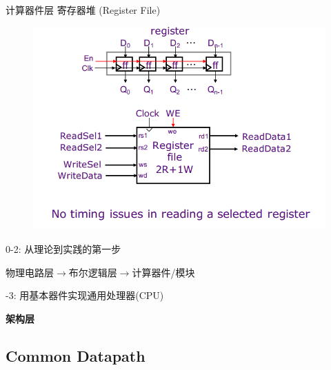 \documentclass[UTF8]{ctexbeamer}
\begin{document}
\begin{frame}{计算器件层}
寄存器堆 (Register File)
\begin{figure}
\centering
\includegraphics[width=0.8\linewidth]{fig/Lecture2/register_files.PNG}
\end{figure}
\end{frame}

\begin{frame}
0-2: 从理论到实践的第一步
\begin{center}
物理电路层$\to$布尔逻辑层$\to$计算器件/模块
\end{center}
-3: 用基本器件实现通用处理器(CPU)
\begin{center}
\Large\textbf{架构层}
\end{center}
\end{frame}

\subsection{Common Datapath}
\begin{frame}
\subsectionpage
\end{frame}
\end{document}
